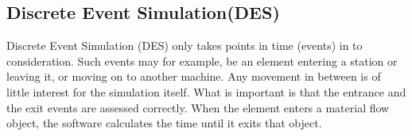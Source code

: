 \subsection{Discrete Event Simulation(DES)}
 Discrete Event Simulation (DES) only takes points in time (events) in to consideration. Such events may for example, be an element entering a station or leaving it, or moving on to another machine. Any movement in between is of little interest for the simulation itself. What is important is that the entrance and the exit events are assessed correctly. When the element enters a material flow object, the software calculates the time until it exits that object. 
